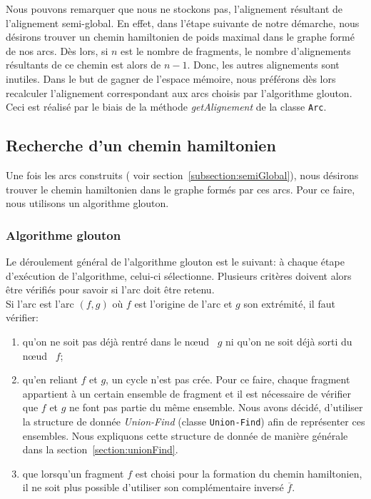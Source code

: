 Nous pouvons remarquer que nous ne stockons pas, l'alignement résultant de l'alignement semi-global. En effet, dans l'étape suivante de notre démarche, nous désirons trouver un chemin hamiltonien de poids maximal dans le graphe formé de nos arcs. Dès lors, si $n$ est le nombre de fragments, le nombre d'alignements résultants de ce chemin est alors de $n-1$. Donc, les autres alignements sont inutiles. Dans le but de gagner de l'espace mémoire, nous préférons dès lors recalculer l'alignement correspondant aux arcs choisis par l'algorithme glouton. Ceci est réalisé par le biais de la méthode \emph{getAlignement} de la classe \verb|Arc|.


\subsection{Recherche d'un chemin hamiltonien}
\label{subsection:greedy}

Une fois les arcs construits ( voir section~\ref{subsection:semiGlobal}), nous désirons trouver le chemin hamiltonien dans le graphe formés par ces arcs. Pour ce faire, nous utilisons un algorithme glouton.

\subsubsection{Algorithme glouton}

Le déroulement général de l'algorithme glouton est le suivant: à chaque étape d'exécution de l'algorithme, celui-ci sélectionne. Plusieurs critères doivent alors être vérifiés pour savoir si l'arc doit être retenu. \\

Si l'arc est l'arc $(f,g)$ où $f$ est l'origine de l'arc et $g$ son extrémité, il faut vérifier:
\begin{enumerate}
 \item qu'on ne soit pas déjà rentré dans le \og n\oe{}ud \fg~$g$ ni qu'on ne soit déjà sorti du \og n\oe{}ud \fg~$f$;
 \item qu'en reliant $f$ et $g$, un cycle n'est pas crée. Pour ce faire, chaque fragment appartient à un certain ensemble de fragment et il est nécessaire de vérifier que $f$ et $g$ ne font pas partie du même ensemble. Nous avons décidé, d'utiliser la structure de donnée \emph{Union-Find} (classe \verb|Union-Find|) afin de représenter ces ensembles. Nous expliquons cette structure de donnée de manière générale dans la section~\ref{section:unionFind}.
 \item que lorsqu'un fragment $f$ est choisi pour la formation du chemin hamiltonien, il ne soit plus possible d'utiliser son complémentaire inversé $\overline{f}$. \\
\end{enumerate}

